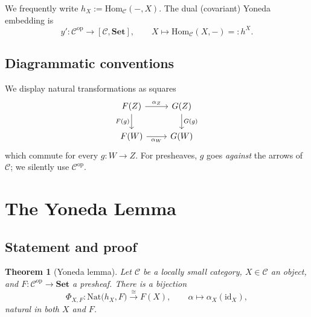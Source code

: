 \documentclass[12pt]{article}
\newtheorem{theorem}{Theorem}[section]
\theoremstyle{definition}
\theoremstyle{remark}
\begin{document}
We frequently write $h_X := \mathrm{Hom}_{\mathcal{C}}(-, X)$. The dual (covariant) Yoneda embedding is
\[
y'\colon \mathcal{C}^{\mathrm{op}} \longrightarrow [\mathcal{C}, \mathbf{Set}],\qquad X \longmapsto \mathrm{Hom}_{\mathcal{C}}(X, -) =: h^{X}.
\]

\subsection{Diagrammatic conventions}

We display natural transformations as squares
\[
\begin{tikzcd}
F(Z) \arrow[r, "\alpha_Z"] \arrow[d, "F(g)"'] & G(Z) \arrow[d, "G(g)"] \\
F(W) \arrow[r, "\alpha_W"'] & G(W)
\end{tikzcd}
\]
which commute for every $g\colon W \to Z$. For presheaves, $g$ goes \emph{against} the arrows of $\mathcal{C}$; we silently use $\mathcal{C}^{\mathrm{op}}$.

\section{The Yoneda Lemma}
\label{sec:yoneda-lemma}

\subsection{Statement and proof}

\begin{theorem}[Yoneda lemma]
\label{thm:yoneda}
Let $\mathcal{C}$ be a locally small category, $X \in \mathcal{C}$ an object, and $F\colon \mathcal{C}^{\mathrm{op}} \to \mathbf{Set}$ a presheaf. There is a bijection
\[
\Phi_{X,F}\colon \mathrm{Nat}\big(h_X, F\big) \xrightarrow{\;\cong\;} F(X),
\qquad
\alpha \longmapsto \alpha_X(\mathrm{id}_X),
\]
natural in both $X$ and $F$.
\end{theorem}
\end{document}
